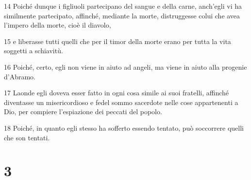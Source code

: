\par 14 Poiché dunque i figliuoli partecipano del sangue e della carne, anch'egli vi ha similmente partecipato, affinché, mediante la morte, distruggesse colui che avea l'impero della morte, cioè il diavolo,
\par 15 e liberasse tutti quelli che per il timor della morte erano per tutta la vita soggetti a schiavitù.
\par 16 Poiché, certo, egli non viene in aiuto ad angeli, ma viene in aiuto alla progenie d'Abramo.
\par 17 Laonde egli doveva esser fatto in ogni cosa simile ai suoi fratelli, affinché diventasse un misericordioso e fedel sommo sacerdote nelle cose appartenenti a Dio, per compiere l'espiazione dei peccati del popolo.
\par 18 Poiché, in quanto egli stesso ha sofferto essendo tentato, può soccorrere quelli che son tentati.

\chapter{3}

